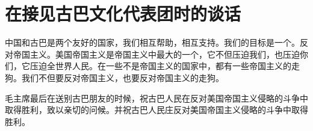 \section[在接见古巴文化代表团时的谈话（一九六一年四月十九日）]{在接见古巴文化代表团时的谈话}

中国和古巴是两个友好的国家，我们相互帮助，相互支持。我们的目标是一个。反对帝国主义。美国帝国主义是帝国主义中最大的一个，它不但压迫我们，也压迫你们，它压迫全世界人民。在一些不是帝国主义的国家中，都有一些帝国主义的走狗。我们不但要反对帝国主义，也要反对帝国主义的走狗。

毛主席最后在送别古巴朋友的时候，祝古巴人民在反对美国帝国主义侵略的斗争中取得胜利，致以亲切的问候。并祝古巴人民庄反对美国帝国主义侵略的斗争中取得胜利。


